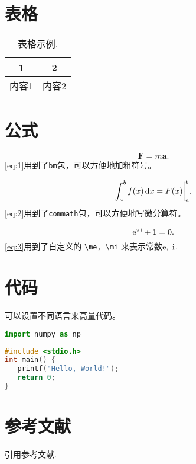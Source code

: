 \section{表格}


\begin{table}[htp]
   \centering
   \caption{表格示例.}
   \begin{tabular}{cc}
      \toprule  1 & 2   \\
      \midrule
      内容1         & 内容2 \\
      \bottomrule
   \end{tabular}
   \label{tab:1}
\end{table}

\section{公式}


\begin{equation}
   \bm{F} = m\bm{a}.
   \label{eq:1}
\end{equation}
\cref{eq:1}用到了\texttt{bm}包，可以方便地加粗符号。

\begin{equation}
   \int^b_a f(x) \dif x=F(x)\bigg|^b_a.
   \label{eq:2}
\end{equation}
\cref{eq:2}用到了\texttt{commath}包，可以方便地写微分算符。

\begin{equation}
   \mathrm{e} ^{\pi \mathrm{i}} + 1 = 0.
   \label{eq:3}
\end{equation}
\cref{eq:3}用到了自定义的 \verb"\me, \mi" 来表示常数$\mathrm{e},\ \mathrm{i}$.

\section{代码}

可以设置不同语言来高量代码。

\begin{lstlisting}[language=python]
import numpy as np
\end{lstlisting}

\begin{lstlisting}[language=c]
#include <stdio.h>
int main() {
   printf("Hello, World!");
   return 0;
}
\end{lstlisting}

\section{参考文献}

引用参考文献.
